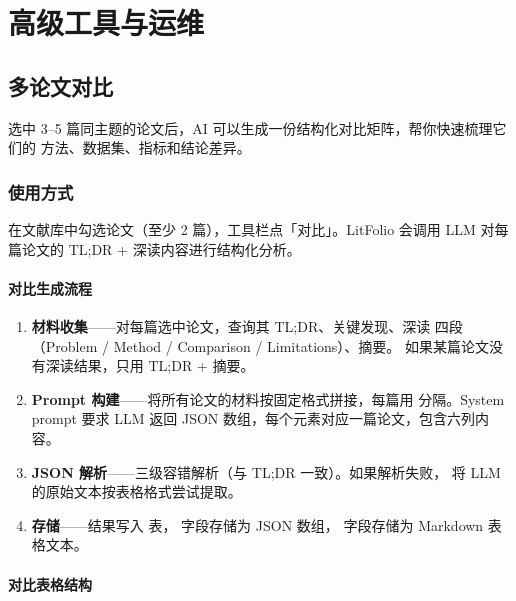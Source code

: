 \part{高级工具与运维}

\chapter{多论文对比}
\label{ch:compare}

选中 3--5 篇同主题的论文后，AI 可以生成一份结构化对比矩阵，帮你快速梳理它们的
方法、数据集、指标和结论差异。

\section{使用方式}

在文献库中勾选论文（至少 2 篇），工具栏点「对比」。LitFolio 会调用 LLM
对每篇论文的 TL;DR + 深读内容进行结构化分析。


\subsection{对比生成流程}

\begin{enumerate}
  \item \textbf{材料收集}——对每篇选中论文，查询其 TL;DR、关键发现、深读
    四段（Problem / Method / Comparison / Limitations）、摘要。
    如果某篇论文没有深读结果，只用 TL;DR + 摘要。
  \item \textbf{Prompt 构建}——将所有论文的材料按固定格式拼接，每篇用
     分隔。System prompt 要求 LLM 返回
    JSON 数组，每个元素对应一篇论文，包含六列内容。
  \item \textbf{JSON 解析}——三级容错解析（与 TL;DR 一致）。如果解析失败，
    将 LLM 的原始文本按表格格式尝试提取。
  \item \textbf{存储}——结果写入  表，
     字段存储为 JSON 数组， 字段存储为
    Markdown 表格文本。
\end{enumerate}

\subsection{对比表格结构}

